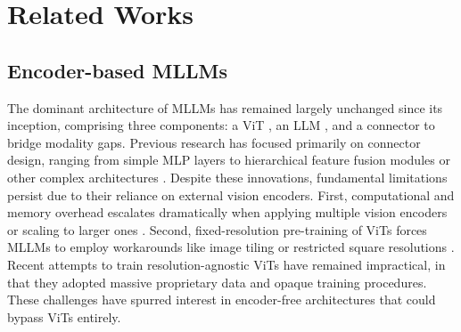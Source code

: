 \section{Related Works}
\label{sec:related}
\subsection{Encoder-based MLLMs}
The dominant architecture of MLLMs has remained largely unchanged since its inception, comprising three components: a ViT \cite{clip, siglip, aimv2}, an LLM \cite{llama, gpt3, qwen2.5, vicuna}, and a connector to bridge modality gaps. Previous research has focused primarily on connector design, ranging from simple MLP layers \cite{llava, llava1_5, minigpt, minigptv2} to hierarchical feature fusion modules \cite{flamingo, llama3.2} or other complex architectures \cite{elysium, dynamicvlm, internvl, cambrian1}. Despite these innovations, fundamental limitations persist due to their reliance on external vision encoders. First, computational and memory overhead escalates dramatically when applying multiple vision encoders \cite{cambrian1} or scaling to larger ones \cite{cogvlm}. Second, fixed-resolution pre-training of ViTs forces MLLMs to employ workarounds like image tiling \cite{llava1_5, llavaov} or restricted square resolutions \cite{cogvlm, qwen}. Recent attempts \cite{pixtral, qwen2vl, aimv2} to train resolution-agnostic ViTs have remained impractical, in that they adopted massive proprietary data and opaque training procedures. These challenges have spurred interest in encoder-free architectures that could bypass ViTs entirely.
